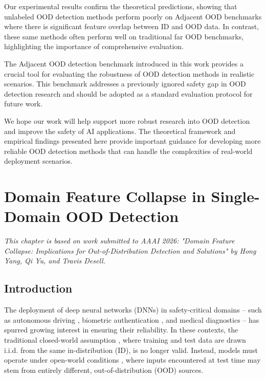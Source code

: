 \documentclass[11pt, oneside]{book}
\theoremstyle{plain}
\theoremstyle{definition}
\theoremstyle{remark}
\begin{document}
Our experimental results confirm the theoretical predictions, showing that unlabeled OOD detection methods perform poorly on Adjacent OOD benchmarks where there is significant feature overlap between ID and OOD data. In contrast, these same methods often perform well on traditional far OOD benchmarks, highlighting the importance of comprehensive evaluation.

The Adjacent OOD detection benchmark introduced in this work provides a crucial tool for evaluating the robustness of OOD detection methods in realistic scenarios. This benchmark addresses a previously ignored safety gap in OOD detection research and should be adopted as a standard evaluation protocol for future work.

We hope our work will help support more robust research into OOD detection and improve the safety of AI applications. The theoretical framework and empirical findings presented here provide important guidance for developing more reliable OOD detection methods that can handle the complexities of real-world deployment scenarios.





\chapter{Domain Feature Collapse in Single-Domain OOD Detection}

\textit{This chapter is based on work submitted to AAAI 2026: "Domain Feature Collapse: Implications for Out-of-Distribution Detection and Solutions" by Hong Yang, Qi Yu, and Travis Desell.}

\section{Introduction}

The deployment of deep neural networks (DNNs) in safety-critical domains -- such as autonomous driving \citep{ramanagopal2018failing}, biometric authentication \citep{wang2021deep}, and medical diagnostics \citep{bakator2018deep} -- has spurred growing interest in ensuring their reliability. In these contexts, the traditional closed-world assumption \citep{krizhevsky2012imagenet}, where training and test data are drawn i.i.d. from the same in-distribution (ID), is no longer valid. Instead, models must operate under open-world conditions \citep{drummond2006open}, where inputs encountered at test time may stem from entirely different, out-of-distribution (OOD) sources.
\end{document}
